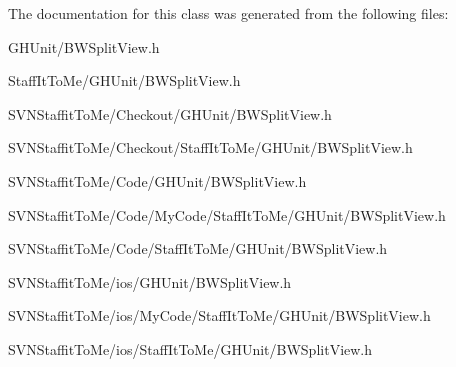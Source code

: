 \-The documentation for this class was generated from the following files\-:\begin{DoxyCompactItemize}
\item 
\-G\-H\-Unit/\-B\-W\-Split\-View.\-h\item 
\-Staff\-It\-To\-Me/\-G\-H\-Unit/\-B\-W\-Split\-View.\-h\item 
\-S\-V\-N\-Staffit\-To\-Me/\-Checkout/\-G\-H\-Unit/\-B\-W\-Split\-View.\-h\item 
\-S\-V\-N\-Staffit\-To\-Me/\-Checkout/\-Staff\-It\-To\-Me/\-G\-H\-Unit/\-B\-W\-Split\-View.\-h\item 
\-S\-V\-N\-Staffit\-To\-Me/\-Code/\-G\-H\-Unit/\-B\-W\-Split\-View.\-h\item 
\-S\-V\-N\-Staffit\-To\-Me/\-Code/\-My\-Code/\-Staff\-It\-To\-Me/\-G\-H\-Unit/\-B\-W\-Split\-View.\-h\item 
\-S\-V\-N\-Staffit\-To\-Me/\-Code/\-Staff\-It\-To\-Me/\-G\-H\-Unit/\-B\-W\-Split\-View.\-h\item 
\-S\-V\-N\-Staffit\-To\-Me/ios/\-G\-H\-Unit/\-B\-W\-Split\-View.\-h\item 
\-S\-V\-N\-Staffit\-To\-Me/ios/\-My\-Code/\-Staff\-It\-To\-Me/\-G\-H\-Unit/\-B\-W\-Split\-View.\-h\item 
\-S\-V\-N\-Staffit\-To\-Me/ios/\-Staff\-It\-To\-Me/\-G\-H\-Unit/\-B\-W\-Split\-View.\-h\end{DoxyCompactItemize}
